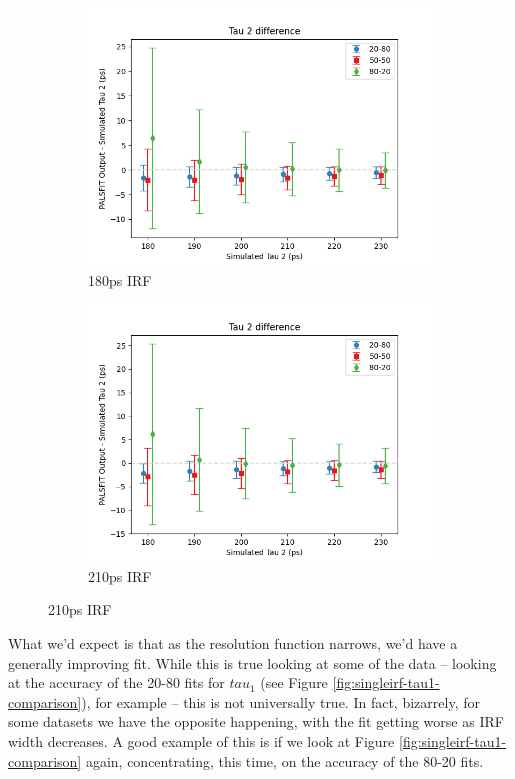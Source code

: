 \begin{figure}[H]
{\begin{subfigure}{0.7\textwidth}
        \centering
        \includegraphics[width=.95\textwidth]{Batch 3/single Gaussian IRF/gauss180/150/output/t2.png}
        \caption{180ps IRF}
        \label{fig:t2-irf-180}
    \end{subfigure}
    \begin{subfigure}{0.7\textwidth}
        \centering
        \includegraphics[width=.95\textwidth]{Batch 3/single Gaussian IRF/gauss210/150/output/t2f.png}
        \caption{210ps IRF}
        \label{fig:t2-irf-210}
    \end{subfigure}
    }
    \label{fig:singleirf-tau2-comparison}
\end{figure}

What we'd expect is that as the resolution function narrows, we'd have a generally improving fit. While this is true looking at some of the data -- looking at the accuracy of the 20-80 fits for $tau_1$ (see Figure \ref{fig:singleirf-tau1-comparison}), for example -- this is not universally true. In fact, bizarrely, for some datasets we have the opposite happening, with the fit getting worse as IRF width decreases. A good example of this is if we look at Figure \ref{fig:singleirf-tau1-comparison} again, concentrating, this time, on the accuracy of the 80-20 fits.